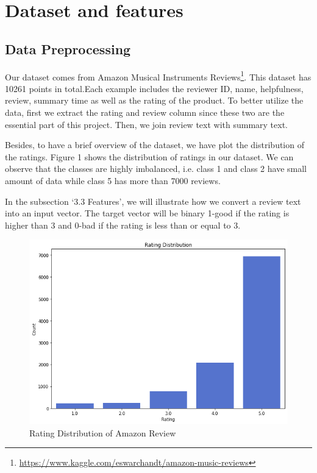 \documentclass[10pt]{article}
\begin{document}
\section{Dataset and features}
\subsection{Data Preprocessing}

Our dataset comes from Amazon Musical Instruments Reviews\footnote{\url{https://www.kaggle.com/eswarchandt/amazon-music-reviews}}. This dataset has 10261 points in total.Each example includes the reviewer ID, name, helpfulness, review, summary time as well as the rating of the product. To better
utilize the data, first we extract the rating and review column since these two are the essential part of this project.
Then, we join review text with summary text. 

Besides, to have a brief overview of the dataset, we have
plot the distribution of the ratings. Figure 1 shows the distribution of ratings in our dataset. We can observe that the classes are highly imbalanced, i.e. class 1 and class 2 have small amount of data
while class 5 has more than 7000 reviews.

In the subsection ‘3.3 Features’, we will illustrate how
we convert a review text into an input vector. The target vector will be binary 1-good if the rating is higher than 3 and 0-bad if the rating is less than or equal to 3. 


\begin{figure}[thb]
    \centering
	\includegraphics[clip,width=0.9\linewidth]{figure1}
	\caption{Rating Distribution of Amazon Review}
	\label{fig: sample-figure}       %
\end{figure}
\end{document}

